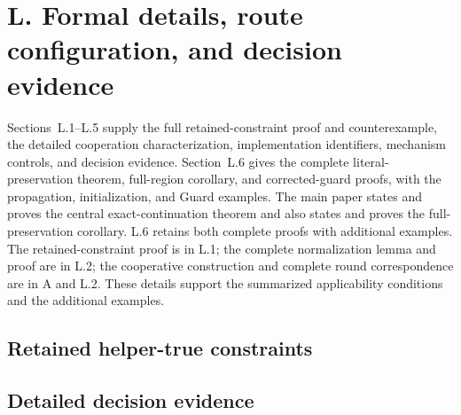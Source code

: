 \section*{L. Formal details, route configuration, and decision evidence}
Sections~L.1--L.5 supply the full retained-constraint proof and
counterexample, the detailed cooperation characterization, implementation
identifiers, mechanism controls, and decision evidence. Section~L.6 gives
the complete literal-preservation theorem, full-region corollary, and
corrected-guard proofs, with the propagation, initialization, and Guard
examples. The main paper states and proves the central exact-continuation theorem
and also states and proves the full-preservation corollary. L.6 retains both complete proofs with additional examples. The retained-constraint proof is in L.1;
the complete normalization lemma and proof are in L.2;
the cooperative construction and complete round correspondence are in
A and L.2. These details support the summarized applicability conditions
and the additional examples.
\setcounter{subsection}{0}
\renewcommand{\thesubsection}{L.\arabic{subsection}}
\renewcommand{\theHsubsection}{L.\arabic{subsection}}
\setcounter{theorem}{0}
\renewcommand{\thetheorem}{L.\arabic{theorem}}
\renewcommand{\theHtheorem}{L.\arabic{theorem}}
\setcounter{lemma}{0}
\renewcommand{\thelemma}{L.\arabic{lemma}}
\renewcommand{\theHlemma}{L.\arabic{lemma}}
\setcounter{equation}{0}
\renewcommand{\theequation}{L.\arabic{equation}}
\renewcommand{\theHequation}{L.\arabic{equation}}
\subsection{Retained helper-true constraints}\label{sec:formal}



\clearpage
\subsection{Detailed decision evidence}

\clearpage


